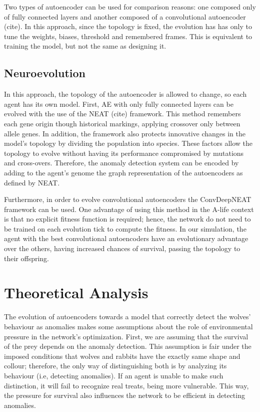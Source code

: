 \documentclass[letterpaper]{article}
\numberwithin{equation}{section}
\numberwithin{theorem}{section}
\numberwithin{lemma}{section}
\numberwithin{df}{section}
\begin{document}
Two types of autoencoder can be used for comparison reasons: one composed only of fully connected layers and another composed of a convolutional autoencoder (cite). In this approach, since the topology is fixed, the evolution  has has only to tune the weights, biases, threshold and remembered frames. This is equivalent to training the model, but not the same as designing it.

\subsection{Neuroevolution}

In this approach, the topology of the autoencoder is allowed to change, so each agent has its own model. First, AE with only fully connected layers can be evolved with the use of the NEAT (cite) framework. This method remembers each gene origin though historical markings, applying crossover only between allele genes. In addition, the framework also protects innovative changes in the model's topology by dividing the population into species. These factors allow the topology to evolve without having its performance compromised by mutations and cross-overs. Therefore, the anomaly detection system can be encoded by adding to the agent's genome the graph representation of the autoencoders as defined by NEAT.

Furthermore, in order to evolve convolutional autoencoders the ConvDeepNEAT framework can be used. One advantage of using this method in the A-life context is that no explicit fitness function is required; hence, the network do not need to be trained on each evolution tick to compute the fitness. In our simulation, the agent with the best convolutional autoencoders have an evolutionary advantage over the others, having increased chances of survival, passing the topology to their offspring.



\section{Theoretical Analysis}

The evolution of autoencoders towards a model that correctly detect the wolves' behaviour as anomalies makes some assumptions about the role of environmental pressure in the network's optimization. First, we are assuming that the survival of the prey depends on the anomaly detection. This assumption is fair under the imposed conditions that wolves and rabbits have the exactly same shape and collour; therefore, the only way of distinguishing both is by analyzing its behaviour (i.e, detecting anomalies). If an agent is unable to make such distinction, it will fail to recognize real treats, being more vulnerable. This way, the pressure for survival also influences the network to be efficient in detecting anomalies.
\end{document}
